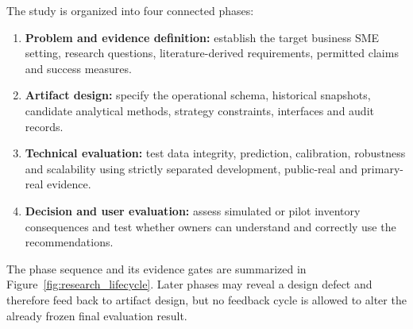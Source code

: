 The study is organized into four connected phases:

\begin{enumerate}[label=P\arabic*.]
  \item \textbf{Problem and evidence definition:} establish the target business SME
  setting, research questions, literature-derived requirements, permitted
  claims and success measures.
  \item \textbf{Artifact design:} specify the operational schema, historical
  snapshots, candidate analytical methods, strategy constraints, interfaces and
  audit records.
  \item \textbf{Technical evaluation:} test data integrity, prediction,
  calibration, robustness and scalability using strictly separated development,
  public-real and primary-real evidence.
  \item \textbf{Decision and user evaluation:} assess simulated or pilot
  inventory consequences and test whether owners can understand and correctly
  use the recommendations.
\end{enumerate}

The phase sequence and its evidence gates are summarized in
Figure~\ref{fig:research_lifecycle}. Later phases may reveal a design defect and
therefore feed back to artifact design, but no feedback cycle is allowed to
alter the already frozen final evaluation result.

